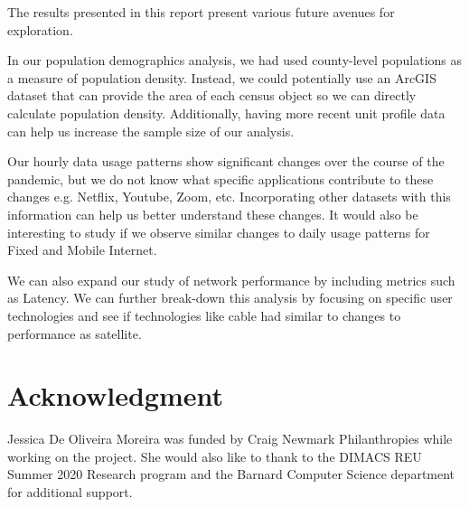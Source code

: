 \documentclass[conference,10pt]{IEEEtran}
\begin{document}
The results presented in this report present various future avenues for exploration.

In our population demographics analysis, we had used county-level populations as a measure of population density. Instead, we could potentially use an ArcGIS dataset that can provide the area of each census object so we can directly calculate population density. Additionally, having more recent unit profile data can help us increase the sample size of our analysis.

Our hourly data usage patterns show significant changes over the course of the pandemic, but we do not know what specific applications contribute to these changes e.g. Netflix, Youtube, Zoom, etc. Incorporating other datasets with this information can help us better understand these changes. It would also be interesting to study if we observe similar changes to daily usage patterns for Fixed and Mobile Internet.

We can also expand our study of network performance by including metrics such as Latency. We can further break-down this analysis by focusing on specific user technologies and see if technologies like cable had similar to changes to performance as satellite.

\section*{Acknowledgment}
\label{sec:acknowledgment}

Jessica De Oliveira Moreira was funded by Craig Newmark Philanthropies while working on the project. She would also like to thank to the DIMACS REU Summer 2020 Research program and the Barnard Computer Science department for additional support.



\end{document}
